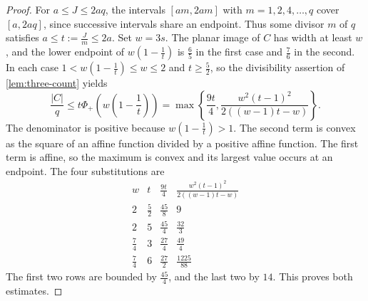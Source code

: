 \documentclass[reqno, 11pt]{article}
\numberwithin{equation}{section}
\theoremstyle{definition}
\begin{document}
\begin{proof}
For $a\le J\le2aq$, the intervals $[am,2am]$ with $m=1,2,4,\ldots,q$
cover $[a,2aq]$, since successive intervals share an endpoint.
Thus some divisor $m$ of $q$ satisfies $a\le t:=\frac{J}{m}\le2a$.
Set $w=3s$. The planar image of $C$ has width at least $w$, and
the lower endpoint of $w(1-\frac{1}{t})$ is $\frac{6}{5}$ in the
first case and $\frac{7}{6}$ in the second. In each case
$1<w(1-\frac{1}{t})\le w\le2$ and $t\ge\frac{5}{2}$, so the
divisibility assertion of \cref{lem:three-count} yields
\[
 \frac{|C|}{q}\le t\Phi_+\left(w\left(1-\frac{1}{t}\right)\right)
   =\max\left\{\frac{9t}{4},\frac{w^2(t-1)^2}{2((w-1)t-w)}\right\}.
\]
The denominator is positive because $w(1-\frac{1}{t})>1$. The
second term is convex as the square of an affine function divided by
a positive affine function. The first term is affine, so the maximum
is convex and its largest value occurs at an endpoint. The four
substitutions are
\[
\renewcommand{\arraystretch}{1.3}
\begin{array}{cc|cc}
 w&t&\frac{9t}{4}&\frac{w^2(t-1)^2}{2((w-1)t-w)}\\ \hline
 2&\frac{5}{2}&\frac{45}{8}&9\\
 2&5&\frac{45}{4}&\frac{32}{3}\\
 \frac{7}{4}&3&\frac{27}{4}&\frac{49}{4}\\
 \frac{7}{4}&6&\frac{27}{2}&\frac{1225}{88}
\end{array}
\]
The first two rows are bounded by $\frac{45}{4}$, and the last two
by $14$. This proves both estimates.
\end{proof}
\end{document}
